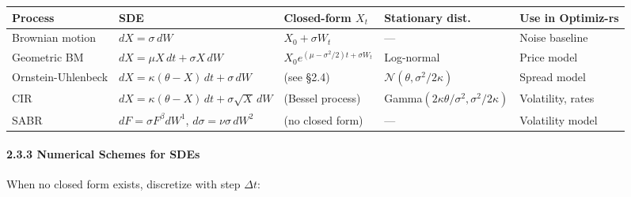\documentclass[11pt,a4paper]{article}
\begin{document}
{\def\LTcaptype{none} %
\begin{longtable}[]{@{}
  >{\raggedright\arraybackslash}p{}
  >{\raggedright\arraybackslash}p{}
  >{\raggedright\arraybackslash}p{}
  >{\raggedright\arraybackslash}p{}
  >{\raggedright\arraybackslash}p{}@{}}
\toprule\noalign{}
\begin{minipage}[b]{\linewidth}\raggedright
Process
\end{minipage} & \begin{minipage}[b]{\linewidth}\raggedright
SDE
\end{minipage} & \begin{minipage}[b]{\linewidth}\raggedright
Closed-form \(X_t\)
\end{minipage} & \begin{minipage}[b]{\linewidth}\raggedright
Stationary dist.
\end{minipage} & \begin{minipage}[b]{\linewidth}\raggedright
Use in Optimiz-rs
\end{minipage} \\
\midrule\noalign{}
\endhead
\bottomrule\noalign{}
\endlastfoot
Brownian motion & \(dX = \sigma\,dW\) & \(X_0 + \sigma W_t\) & --- & Noise baseline \\
Geometric BM & \(dX = \mu X\,dt + \sigma X\,dW\) & \(X_0 e^{(\mu-\sigma^2/2)t+\sigma W_t}\) & Log-normal & Price model \\
Ornstein-Uhlenbeck & \(dX = \kappa(\theta-X)\,dt + \sigma\,dW\) & (see §2.4) & \(\mathcal{N}(\theta, \sigma^2/2\kappa)\) & Spread model \\
CIR & \(dX = \kappa(\theta-X)\,dt + \sigma\sqrt{X}\,dW\) & (Bessel process) & Gamma\((2\kappa\theta/\sigma^2, \sigma^2/2\kappa)\) & Volatility, rates \\
SABR & \(dF = \sigma F^\beta dW^1\), \(d\sigma = \nu\sigma\,dW^2\) & (no closed form) & --- & Volatility model \\
\end{longtable}
}

\paragraph{2.3.3 Numerical Schemes for SDEs}\label{numerical-schemes-for-sdes}

When no closed form exists, discretize with step \(\Delta t\):
\end{document}
